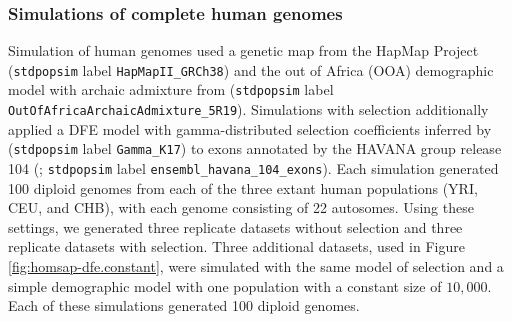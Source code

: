 \documentclass[hidelinks]{article}
\newcommand{\stdpopsim}{\texttt{stdpopsim}\xspace}
\begin{document}
    \subsubsection*{Simulations of complete human genomes}
    Simulation of human genomes used a genetic map from the HapMap Project
    \citep{international2007second} (\stdpopsim label \texttt{HapMapII\_GRCh38}) and
    the out of Africa (OOA) demographic model with archaic admixture from
    \cite{ragsdale2019models} (\stdpopsim label \texttt{OutOfAfricaArchaicAdmixture\_5R19}).
    Simulations with selection additionally applied a DFE model with gamma-distributed selection coefficients inferred by
    \cite{kim2017inference} (\stdpopsim label \texttt{Gamma\_K17}) to exons annotated by the HAVANA group release 104
    (\cite{ensembl2018}; \stdpopsim label \texttt{ensembl\_havana\_104\_exons}).
    Each simulation generated 100 diploid genomes from each of the three extant human populations (YRI, CEU, and CHB),
    with each genome consisting of 22 autosomes.
    Using these settings, we generated three replicate datasets without selection
    and three replicate datasets with selection.
    Three additional datasets, used in Figure \ref{fig:homsap-dfe.constant},
    were simulated with the same model of selection and a simple demographic model with one population with a constant size of $10,000$.
    Each of these simulations generated 100 diploid genomes.
    
\end{document}
